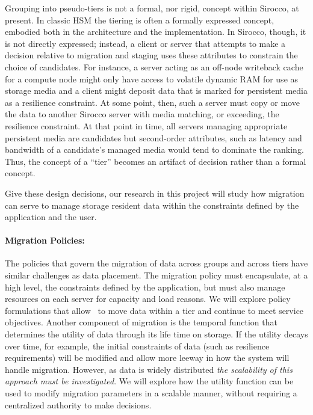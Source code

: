 Grouping into pseudo-tiers is not a formal, nor rigid, concept within
Sirocco, at present. In classic HSM the tiering is often a formally
expressed concept, embodied both in the architecture and the implementation.
In Sirocco, though, it is not directly expressed; instead, a client or
server that attempts to make a decision relative to migration and staging
uses these attributes to constrain the choice of candidates. For instance, a
server acting as an off-node writeback cache for a compute node might only
have access to volatile dynamic RAM for use as storage media and a client
might deposit data that is marked for persistent media as a resilience
constraint. At some point, then, such a server must copy or move the data to
another Sirocco server with media matching, or exceeding, the resilience
constraint. At that point in time, all servers managing appropriate
persistent media are candidates but second-order attributes, such as latency
and bandwidth of a candidate's managed media would tend to dominate the
ranking. Thus, the concept of a ``tier'' becomes an artifact of decision
rather than a formal concept.

Give these design decisions, our research in this project will study how
migration can serve to manage storage resident data within the constraints
defined by the application and the user. 

\paragraph{Migration Policies:}
The policies that govern the migration of data across groups and across
tiers have similar challenges as data placement. The migration
policy must encapsulate, at a high level, the constraints defined by the
application, but must also manage resources on each server for capacity and
load reasons. We will explore policy formulations that allow \Sir~to move
data within a tier and continue to meet service objectives. Another component
of migration is the temporal function that determines the utility of data
through its life time on storage. If the utility decays over time, for
example, the initial constraints of data (such as resilience requirements)
will be modified and allow more leeway in how the system will handle migration.
However, as data is widely distributed {\it the scalability of this approach must
be investigated}. 
We will explore how the utility function can be used to modify migration
parameters in a scalable manner, without requiring a centralized authority
to make decisions. 

